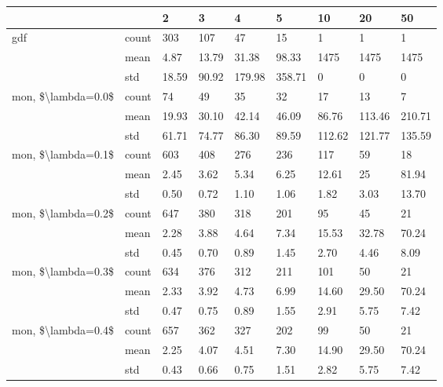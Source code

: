 \begin{tabular}{lllllllll}
\toprule
                   &     &    2  &    3  &     4  &     5  &     10 &     20 &     50 \\
\midrule
gdf & count &   303 &   107 &     47 &     15 &      1 &      1 &      1 \\
                   & mean &  4.87 & 13.79 &  31.38 &  98.33 &   1475 &   1475 &   1475 \\
                   & std & 18.59 & 90.92 & 179.98 & 358.71 &      0 &      0 &      0 \\
mon, \$\textbackslash lambda=0.0\$ & count &    74 &    49 &     35 &     32 &     17 &     13 &      7 \\
                   & mean & 19.93 & 30.10 &  42.14 &  46.09 &  86.76 & 113.46 & 210.71 \\
                   & std & 61.71 & 74.77 &  86.30 &  89.59 & 112.62 & 121.77 & 135.59 \\
mon, \$\textbackslash lambda=0.1\$ & count &   603 &   408 &    276 &    236 &    117 &     59 &     18 \\
                   & mean &  2.45 &  3.62 &   5.34 &   6.25 &  12.61 &     25 &  81.94 \\
                   & std &  0.50 &  0.72 &   1.10 &   1.06 &   1.82 &   3.03 &  13.70 \\
mon, \$\textbackslash lambda=0.2\$ & count &   647 &   380 &    318 &    201 &     95 &     45 &     21 \\
                   & mean &  2.28 &  3.88 &   4.64 &   7.34 &  15.53 &  32.78 &  70.24 \\
                   & std &  0.45 &  0.70 &   0.89 &   1.45 &   2.70 &   4.46 &   8.09 \\
mon, \$\textbackslash lambda=0.3\$ & count &   634 &   376 &    312 &    211 &    101 &     50 &     21 \\
                   & mean &  2.33 &  3.92 &   4.73 &   6.99 &  14.60 &  29.50 &  70.24 \\
                   & std &  0.47 &  0.75 &   0.89 &   1.55 &   2.91 &   5.75 &   7.42 \\
mon, \$\textbackslash lambda=0.4\$ & count &   657 &   362 &    327 &    202 &     99 &     50 &     21 \\
                   & mean &  2.25 &  4.07 &   4.51 &   7.30 &  14.90 &  29.50 &  70.24 \\
                   & std &  0.43 &  0.66 &   0.75 &   1.51 &   2.82 &   5.75 &   7.42 \\

\end{tabular}
